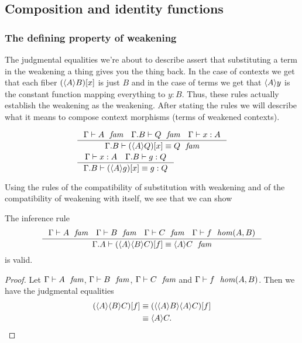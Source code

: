 \subsection{Composition and identity functions}
\subsubsection{The defining property of weakening}
The judgmental equalities we're about to describe assert that substituting a term
in the weakening a thing gives you the thing back. In the case of contexts we get that each fiber
$\subst{x}{\ctxwk{A}{B}}$ is just $B$ and in the case of terms we get 
that $\ctxwk{A}{y}$ is the constant function
mapping everything to $y:B$. Thus, these rules actually establish the weakening
as the weakening. After stating the rules we will describe what it means to
compose context morphisms (terms of weakened contexts).

\begin{align}
& \inference
  {\jfam{\Gamma}{A}
   \jfam{{\Gamma}{B}}{Q}
   \jterm{\Gamma}{A}{x}}
  {\jfameq{{\Gamma}{B}}{\subst{x}{\ctxwk{A}{Q}}}{Q}}
  \label{defn-ws-3}\\
& \inference
  {\jterm{\Gamma}{A}{x}
   \jterm{{\Gamma}{B}}{Q}{g}}
  {\jtermeq{{\Gamma}{B}}{Q}{\subst{x}{\ctxwk{A}{g}}}{g}}
  \label{defn-ws-4}
\end{align}

Using the rules of the compatibility of substitution with weakening and of the
compatibility of weakening with itself, we see that we can show

\begin{lem}
The inference rule
\begin{equation*}
\inference
  {\jfam{\Gamma}{A}
   \jfam{\Gamma}{B}
   \jfam{\Gamma}{C}
   \jhom{\Gamma}{A}{B}{f}}
  {\jfameq{{\Gamma}{A}}
    {\subst{f}{\ctxwk{A}{{B}{C}}}}
    {\ctxwk{A}{C}}}
\end{equation*}
is valid.
\end{lem}

\begin{proof}
Let $\jfam{\Gamma}{A}$, $\jfam{\Gamma}{B}$, $\jfam{\Gamma}{C}$ and $\jhom{\Gamma}{A}{B}{f}$.
Then we have the judgmental equalities
\begin{align*}
\subst{f}{\ctxwk{A}{{B}{C}}}
& \jdeq \subst{f}{\ctxwk{{A}{B}}{{A}{C}}}\\
& \jdeq \ctxwk{A}{C}.
\end{align*}
\end{proof}

